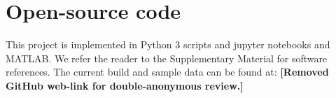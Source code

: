 \documentclass[paper-main.tex]{subfiles}
\begin{document}
\section{Open-source code}
\label{app:code}
This project is implemented in Python 3 scripts and jupyter notebooks and MATLAB. 
We refer the reader to the Supplementary Material for software references. 
The current build and sample data can be found at:
\textbf{[Removed GitHub web-link for double-anonymous review.]}
\end{document}
